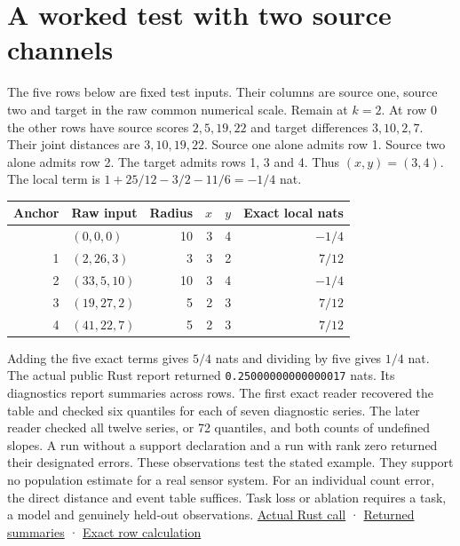 \clearpage

\section{A worked test with two source channels}\label{a-worked-test-with-two-source-channels}

The five rows below are fixed test inputs. Their columns are source one, source two and target in the raw common numerical scale. Remain at \(k=2\). At row 0 the other rows have source scores \(2,5,19,22\) and target differences \(3,10,2,7\). Their joint distances are \(3,10,19,22\). Source one alone admits row 1. Source two alone admits row 2. The target admits rows 1, 3 and 4. Thus \((x,y)=(3,4)\). The local term is \(1+25/12-3/2-11/6=-1/4\) nat.

{\def\LTcaptype{none} %
\begin{longtable}[]{@{}rlrrrr@{}}
\toprule\noalign{}
Anchor & Raw input & Radius & \(x\) & \(y\) & Exact local nats \\
\midrule\noalign{}
\endhead
\bottomrule\noalign{}
\endlastfoot
0 & \((0,0,0)\) & 10 & 3 & 4 & \(-1/4\) \\
1 & \((2,26,3)\) & 3 & 3 & 2 & \(7/12\) \\
2 & \((33,5,10)\) & 10 & 3 & 4 & \(-1/4\) \\
3 & \((19,27,2)\) & 5 & 2 & 3 & \(7/12\) \\
4 & \((41,22,7)\) & 5 & 2 & 3 & \(7/12\) \\
\end{longtable}
}

Adding the five exact terms gives \(5/4\) nats and dividing by five gives \(1/4\) nat. The actual public Rust report returned \texttt{0.25000000000000017} nats. Its diagnostics report summaries across rows. The first exact reader recovered the table and checked six quantiles for each of seven diagnostic series. The later reader checked all twelve series, or 72 quantiles, and both counts of undefined slopes. A run without a support declaration and a run with rank zero returned their designated errors. These observations test the stated example. They support no population estimate for a real sensor system. For an individual count error, the direct distance and event table suffices. Task loss or ablation requires a task, a model and genuinely held-out observations. \href{https://github.com/sepahead/pid-rs/blob/main/audit/research/strict-neighbour-count-geometry/native/src/main.rs}{Actual Rust call} · \href{https://github.com/sepahead/pid-rs/blob/main/audit/research/strict-neighbour-count-geometry/represented-report.json}{Returned summaries} · \href{https://github.com/sepahead/pid-rs/blob/main/audit/research/strict-neighbour-count-geometry/two_arm.py}{Exact row calculation}

